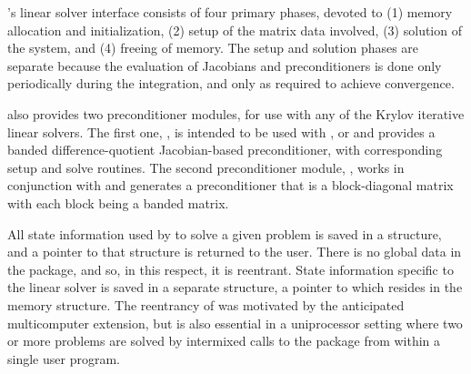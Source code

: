 {\cvode}'s linear solver interface consists of four primary phases,
devoted to (1) memory allocation and initialization, (2) setup of the
matrix data involved, (3) solution of the system, and (4) freeing of memory.  
The setup and solution phases are separate because the evaluation of
Jacobians and preconditioners is done only periodically during the
integration, and only as required to achieve convergence. 

{\cvode} also provides two preconditioner modules, for use with any of
the Krylov iterative linear solvers. The first one, {\cvbandpre},
is intended to be used with {\nvecs}, {\nvecopenmp} or {\nvecpthreads}
and provides a banded difference-quotient Jacobian-based
preconditioner, with corresponding setup and solve routines.
The second preconditioner module, {\cvbbdpre}, works in conjunction
with {\nvecp} and generates a preconditioner that is a block-diagonal
matrix with each block being a banded matrix.

All state information used by {\cvode} to solve a given problem is saved
in a structure, and a pointer to that structure is returned to the
user.  There is no global data in the {\cvode} package, and so, in this
respect, it is reentrant. State information specific to the linear
solver is saved in a separate structure, a pointer to which resides in
the {\cvode} memory structure. The reentrancy of {\cvode} was motivated
by the anticipated multicomputer extension, but is also essential
in a uniprocessor setting where two or more problems are solved by
intermixed calls to the package from within a single user program.
